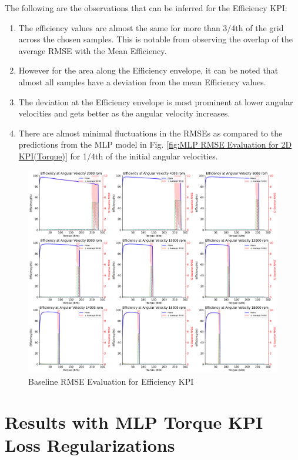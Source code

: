 \documentclass{report} %
\begin{document}
The following are the observations that can be inferred for the Efficiency \ac{KPI}:
\begin{enumerate}[nosep]
    \item The efficiency values are almost the same for more than 3/4th of the grid across the chosen samples. This is notable from observing the overlap of the 
    average \ac{RMSE} with the Mean Efficiency.
    \item However for the area along the Efficiency envelope, it can be noted that almost all samples have a deviation from the mean Efficiency values.
    \item The deviation at the Efficiency envelope is most prominent at lower angular velocities and gets better as the angular velocity increases.
    \item There are almost minimal fluctuations in the \ac{RMSE}s as compared to the predictions from the \ac{MLP} model in 
    Fig. \ref{fig:MLP RMSE Evaluation for 2D KPI(Torque)} for 1/4th of the initial angular velocities.
\end{enumerate}

\begin{figure}[H]
    \centering
    \includegraphics[width=1\textwidth]{./ReportImages/rmse_eta_Baseline.png} 
    \caption{Baseline \ac{RMSE} Evaluation for Efficiency \ac{KPI}} 
    \label{fig:Baseline RMSE Evaluation for Efficiency KPI}
\end{figure}

\section{Results with MLP Torque KPI Loss Regularizations}\label{sec:Results with Torque KPI Loss Regularizations}
\end{document}
